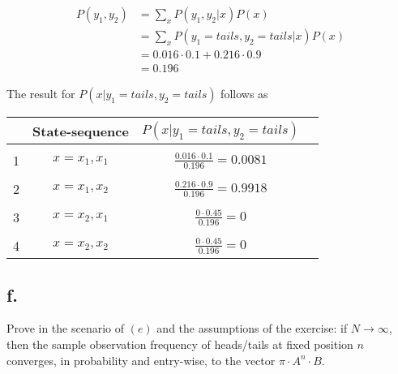 \documentclass[a4paper, 12pt, titlepage]{article}
\begin{document}
\begin{align}
  P(y_1,y_2) &= \sum_{x} P(y_1,y_2|x) P(x)  \\
	     &= \sum_{x} P(y_1=tails,y_2=tails|x) P(x) \\
	     &= 0.016 \cdot 0.1 + 0.216 \cdot 0.9 \\
	     &= 0.196
\end{align}

The result for $P(x|y_1=tails,y_2=tails)$ follows as

\begin{tabular}{l*{2}{c}r}
              & State-sequence &  $P(x|y_1=tails,y_2=tails)$ & \\
\hline
& & & \\
1 & $x=x_1,x_1$ & $\frac{0.016 \cdot 0.1}{0.196} = 0.0081$ \\
& & & \\
2 & $x=x_1,x_2$ & $\frac{0.216 \cdot 0.9}{0.196} =0.9918$ \\
& & & \\
3 & $x=x_2,x_1$ & $\frac{0\cdot 0.45}{0.196} = 0$ \\
& & & \\
4 & $x=x_2,x_2$ & $\frac{0 \cdot 0.45}{0.196} = 0 $ 
 \end{tabular}

 
\subsection*{f.}
Prove in the scenario of $(e)$ and the assumptions of the exercise: if $N \rightarrow \infty$, then the sample observation frequency of heads/tails at fixed position $n$ converges, in probability and entry-wise, to the vector $\pi \cdot A^n \cdot B$.

\
\end{document}
